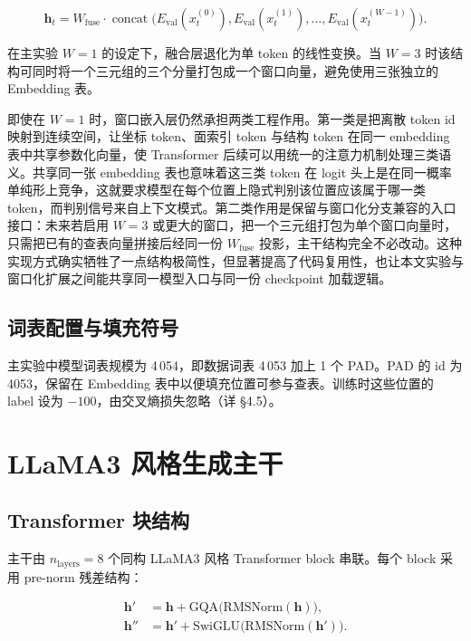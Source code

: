 \begin{equation}
    \mathbf{h}_t = W_{\text{fuse}} \cdot \operatorname{concat}\big(E_{\text{val}}(x_t^{(0)}), E_{\text{val}}(x_t^{(1)}), \ldots, E_{\text{val}}(x_t^{(W-1)})\big).
    \label{eq:embed-fuse}
\end{equation}

在主实验 $W = 1$ 的设定下，融合层退化为单 token 的线性变换。当 $W = 3$ 时该结构可同时将一个三元组的三个分量打包成一个窗口向量，避免使用三张独立的 Embedding 表。

即使在 $W = 1$ 时，窗口嵌入层仍然承担两类工程作用。第一类是把离散 token id 映射到连续空间，让坐标 token、面索引 token 与结构 token 在同一 embedding 表中共享参数化向量，使 Transformer 后续可以用统一的注意力机制处理三类语义。共享同一张 embedding 表也意味着这三类 token 在 logit 头上是在同一概率单纯形上竞争，这就要求模型在每个位置上隐式判别该位置应该属于哪一类 token，而判别信号来自上下文模式。第二类作用是保留与窗口化分支兼容的入口接口：未来若启用 $W = 3$ 或更大的窗口，把一个三元组打包为单个窗口向量时，只需把已有的查表向量拼接后经同一份 $W_{\text{fuse}}$ 投影，主干结构完全不必改动。这种实现方式确实牺牲了一点结构极简性，但显著提高了代码复用性，也让本文实验与窗口化扩展之间能共享同一模型入口与同一份 checkpoint 加载逻辑。


\subsection{词表配置与填充符号}

主实验中模型词表规模为 4\,054，即数据词表 4\,053 加上 1 个 PAD。PAD 的 id 为 4053，保留在 Embedding 表中以便填充位置可参与查表。训练时这些位置的 label 设为 $-100$，由交叉熵损失忽略（详 §4.5）。

\section{LLaMA3 风格生成主干}

\subsection{Transformer 块结构}

主干由 $n_{\text{layers}} = 8$ 个同构 LLaMA3 风格 Transformer block 串联。每个 block 采用 pre-norm 残差结构：

\begin{align}
    \mathbf{h}' &= \mathbf{h} + \text{GQA}\big(\text{RMSNorm}(\mathbf{h})\big), \label{eq:block-attn} \\
    \mathbf{h}'' &= \mathbf{h}' + \text{SwiGLU}\big(\text{RMSNorm}(\mathbf{h}')\big). \label{eq:block-ffn}
\end{align}

